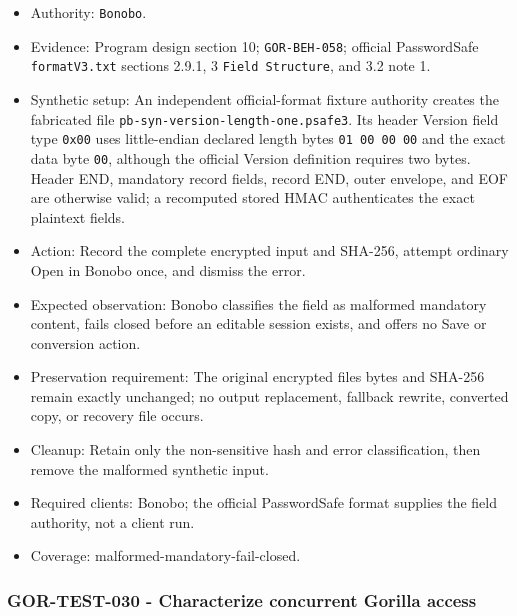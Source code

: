 \documentclass[
  letterpaper,
]{article}
\newcommand{\passthrough}[1]{#1}
\providecommand{\tightlist}{%
  \setlength{\itemsep}{0pt}\setlength{\parskip}{0pt}}
\begin{document}
\begin{itemize}
\tightlist
\item
  Authority: \passthrough{\lstinline!Bonobo!}.
\item
  Evidence: Program design section 10; \nolinkurl{GOR-BEH-058}; official PasswordSafe \nolinkurl{formatV3.txt} sections
  2.9.1, 3 \passthrough{\lstinline!Field Structure!}, and 3.2 note 1.
\item
  Synthetic setup: An independent official-format fixture authority creates the fabricated file
  \nolinkurl{pb-syn-version-length-one.psafe3}. Its header Version field type \passthrough{\lstinline!0x00!} uses
  little-endian declared length bytes \passthrough{\lstinline!01 00 00 00!} and the exact data byte
  \passthrough{\lstinline!00!}, although the official Version definition requires two bytes. Header END, mandatory
  record fields, record END, outer envelope, and EOF are otherwise valid; a recomputed stored HMAC authenticates the
  exact plaintext fields.
\item
  Action: Record the complete encrypted input and SHA-256, attempt ordinary Open in Bonobo once, and dismiss the error.
\item
  Expected observation: Bonobo classifies the field as malformed mandatory content, fails closed before an editable
  session exists, and offers no Save or conversion action.
\item
  Preservation requirement: The original encrypted file\textquotesingle s bytes and SHA-256 remain exactly unchanged; no
  output replacement, fallback rewrite, converted copy, or recovery file occurs.
\item
  Cleanup: Retain only the non-sensitive hash and error classification, then remove the malformed synthetic input.
\item
  Required clients: Bonobo; the official PasswordSafe format supplies the field authority, not a client run.
\item
  Coverage: malformed-mandatory-fail-closed.
\end{itemize}

\subsubsection{GOR-TEST-030 - Characterize concurrent Gorilla
access}\label{gor-test-030---characterize-concurrent-gorilla-access}
\end{document}
